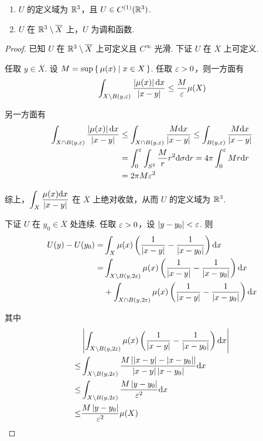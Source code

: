 \begin{property}
    \begin{enumerate}
        \item $U$ 的定义域为 $\mathbb{R}^3$，且 $U\in C^{(1)}(\mathbb{R}^3)$.
        
        \item $U$ 在 $\mathbb{R}^3\setminus\overline{X}$ 上，$U$ 为调和函数.
    \end{enumerate}
\end{property}
\begin{proof}
    已知 $U$ 在 $\mathbb{R}^3\setminus\overline{X}$ 上可定义且 $C^\infty$ 光滑. 下证 $U$ 在 $\overline{X}$ 上可定义.

    任取 $y\in\overline{X}$. 设 $M=\sup\set{\mu(x)|x\in X}$. 任取 $\varepsilon>0$，则一方面有
$$
\int_{X\setminus B(y,\varepsilon)}\frac{\left\lvert{\mu(x)}\right\rvert\mathrm{d} x}{\left\lvert{x-y}\right\rvert}\le\frac{M}{\varepsilon}\mu(X)
$$

    另一方面有
$$
\begin{aligned}
    \int_{X\cap B(y,\varepsilon)}\frac{\left\lvert{\mu(x)}\right\rvert\mathrm{d} x}{\left\lvert{x-y}\right\rvert}&\le\int_{X\cap B(y,\varepsilon)}\frac{M\mathrm{d} x}{\left\lvert{x-y}\right\rvert}\le\int_{B(y,\varepsilon)}\frac{M\mathrm{d} x}{\left\lvert{x-y}\right\rvert}\\
    &=\int_0^\varepsilon\int_{S^2}\frac{M}{r}r^2\mathrm{d}\sigma\mathrm{d} r=4\pi\int_0^\varepsilon Mr\mathrm{d} r\\
    &=2\pi M\varepsilon^2
\end{aligned}
$$

    综上，$\displaystyle\int_X\frac{\mu(x)\mathrm{d} x}{\left\lvert{x-y}\right\rvert}$ 在 $\overline{X}$ 上绝对收敛，从而 $U$ 的定义域为 $\mathbb{R}^3$.

    下证 $U$ 在 $y_0\in\overline{X}$ 处连续. 任取 $\varepsilon>0$，设 $\left\lvert{y-y_0}\right\rvert<\varepsilon$. 则
$$
\begin{aligned}
    U(y)-U(y_0)=&\int_X\mu(x)\left(\frac{1}{\left\lvert{x-y}\right\rvert}-\frac{1}{\left\lvert{x-y_0}\right\rvert}\right)\mathrm{d} x\\
    =&\int_{X\setminus B(y,2\varepsilon)}\mu(x)\left(\frac{1}{\left\lvert{x-y}\right\rvert}-\frac{1}{\left\lvert{x-y_0}\right\rvert}\right)\mathrm{d} x\\
    &+\int_{X\cap B(y,2\varepsilon)}\mu(x)\left(\frac{1}{\left\lvert{x-y}\right\rvert}-\frac{1}{\left\lvert{x-y_0}\right\rvert}\right)\mathrm{d} x
\end{aligned}
$$

    其中
$$
\begin{aligned}
    &\left\lvert{\int_{X\setminus B(y,2\varepsilon)}\mu(x)\left(\frac{1}{\left\lvert{x-y}\right\rvert}-\frac{1}{\left\lvert{x-y_0}\right\rvert}\right)\mathrm{d}x}\right\rvert\\
    \le&\int_{X\setminus B(y,2\varepsilon)}\frac{M\left\lvert{\left\lvert{x-y}\right\rvert-\left\lvert{x-y_0}\right\rvert}\right\rvert}{\left\lvert{x-y}\right\rvert\left\lvert{x-y_0}\right\rvert}\mathrm{d} x\\
    \le&\int_{X\setminus B(y,2\varepsilon)}\frac{M\left\lvert{y-y_0}\right\rvert}{\varepsilon^2}\mathrm{d} x\\
    \le&\frac{M\left\lvert{y-y_0}\right\rvert}{\varepsilon^2}\mu(X)
\end{aligned}
$$


\end{proof}
